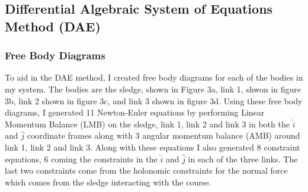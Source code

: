 \documentclass{article}
\begin{document}
\subsection{Differential Algebraic System of Equations Method (DAE)}
\subsubsection{Free Body Diagrams}
To aid in the DAE method, I created free body diagrams for each of the bodies in my system. The bodies are the sledge, shown in Figure 3a, link 1, shwon in figure 3b, link 2 shown in figure 3c, and link 3 shown in figure 3d. Using these free body diagrams, I generated 11 Newton-Euler equations by performing Linear Momentum Balance (LMB) on the sledge, link 1, link 2 and link 3 in both the $\hat{i}$ and $\hat{j}$ coordinate frames along with 3 angular momentum balance (AMB) around link 1, link 2 and link 3. Along with these equations I also generated 8 constraint equations, 6 coming the constraints in the $\hat{i}$ and $\hat{j}$ in each of the three links. The last two constraints come from the holonomic constraints for the normal force which comes from the sledge interacting with the course.
\end{document}
